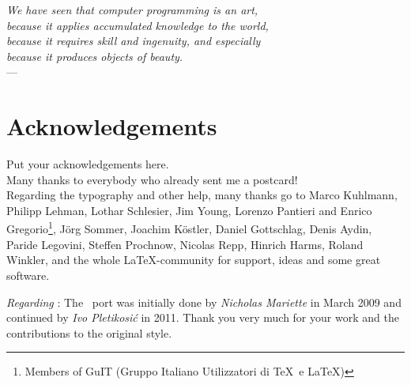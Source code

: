 
\begin{flushright}{\slshape    
We have seen that computer programming is an art, \\ 
because it applies accumulated knowledge to the world, \\ 
because it requires skill and ingenuity, and especially \\
because it produces objects of beauty.} \\ \medskip
---  \citep{knuth:1974}
\end{flushright}
\bigskip

\begingroup
\let\clearpage\relax
\let\cleardoublepage\relax
\let\cleardoublepage\relax

\chapter*{Acknowledgements}
\noindent Put your acknowledgements here.\\
\noindent Many thanks to everybody who already sent me a postcard!\\
\noindent Regarding the typography and other help, many thanks go to Marco Kuhlmann,
Philipp Lehman, Lothar Schlesier, Jim Young, Lorenzo Pantieri and Enrico
Gregorio\footnote{Members of GuIT (Gruppo Italiano Utilizzatori di \TeX\ e \LaTeX )},
J\"org Sommer, Joachim K\"ostler, Daniel Gottschlag, Denis Aydin, Paride Legovini,
Steffen Prochnow, Nicolas Repp, Hinrich Harms, Roland Winkler, and the whole
\LaTeX-community for support, ideas and some great software.
\bigskip

\noindent\emph{Regarding \mLyX}: The \mLyX\ port was initially done by
\emph{Nicholas Mariette} in March 2009 and continued by
\emph{Ivo Pletikosi\'c} in 2011. Thank you very much for your work and the contributions to the original style.
\endgroup
